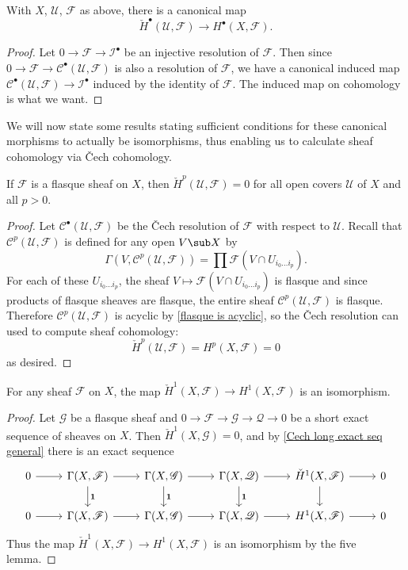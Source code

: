 \begin{corollary}
With $X$, $\mathcal{U}$, $\mathscr{F}$ as above, there is a canonical map
\[\check{H}^\bullet(\mathcal{U},\mathscr{F})\to H^\bullet(X,\mathscr{F}).\]
\end{corollary}
\begin{proof}
Let $0\to\mathscr{F}\to\mathscr{I}^\bullet$ be an injective resolution of $\mathscr{F}$. Then since $0\to\mathscr{F}\to\mathscr{C}^\bullet(\mathcal{U},\mathscr{F})$ is also a resolution of $\mathscr{F}$, we have a canonical induced map $\mathscr{C}^\bullet(\mathcal{U},\mathscr{F})\to\mathscr{I}^\bullet$ induced by the identity of $\mathscr{F}$. The induced map on cohomology is what we want.
\end{proof}
We will now state some results stating sufficient conditions for these
canonical morphisms to actually be isomorphisms, thus enabling us to calculate sheaf cohomology via \v{C}ech cohomology.
\begin{proposition}\label{Cech flasque}
If $\mathscr{F}$ is a flasque sheaf on $X$, then $\check{H}^p(\mathcal{U},\mathscr{F})=0$ for all open covers $\mathcal{U}$ of $X$ and all $p>0$.
\end{proposition}
\begin{proof}
Let $\mathscr{C}^\bullet(\mathcal{U},\mathscr{F})$ be the \v{C}ech resolution of $\mathscr{F}$ with respect to $\mathcal{U}$. Recall that $\mathscr{C}^p(\mathcal{U},\mathscr{F})$ is defined for any open $V\sub X$ by
\[\Gamma(V,\mathscr{C}^p(\mathcal{U},\mathscr{F}))=\prod\mathscr{F}(V\cap U_{i_0\dots i_p}).\]
For each of these $U_{i_0\dots i_p}$, the sheaf $V\mapsto\mathscr{F}(V\cap U_{i_0\dots i_p})$ is flasque and since products of flasque sheaves are flasque, the entire sheaf $\mathscr{C}^p(\mathcal{U},\mathscr{F})$ is flasque. Therefore $\mathscr{C}^p(\mathcal{U},\mathscr{F})$ is acyclic by \cref{flasque is acyclic}, so the \v{C}ech resolution can used to compute sheaf cohomology:
\[\check{H}^p(\mathcal{U},\mathscr{F})=H^p(X,\mathscr{F})=0\]
as desired.
\end{proof}
\begin{corollary}\label{Cech H^1}
For any sheaf $\mathscr{F}$ on $X$, the map $\check{H}^1(X,\mathscr{F})\to H^1(X,\mathscr{F})$ is an isomorphism.
\end{corollary}
\begin{proof}
Let $\mathscr{G}$ be a flasque sheaf and $0\to\mathscr{F}\to\mathscr{G}\to\mathscr{Q}\to 0$ be a short exact sequence of sheaves on $X$. Then $\check{H}^1(X,\mathscr{G})=0$, and by \cref{Cech long exact seq general} there is an exact sequence
\[\begin{tikzcd}
0\ar[r]&\Gamma(X,\mathscr{F})\ar[r]\ar[d,"\mathbf{1}"]&\Gamma(X,\mathscr{G})\ar[r]\ar[d,"\mathbf{1}"]&\Gamma(X,\mathscr{Q})\ar[r]\ar[d,"\mathbf{1}"]&\check{H}^1(X,\mathscr{F})\ar[r]\ar[d]&0\\
0\ar[r]&\Gamma(X,\mathscr{F})\ar[r]&\Gamma(X,\mathscr{G})\ar[r]&\Gamma(X,\mathscr{Q})\ar[r]&H^1(X,\mathscr{F})\ar[r]&0
\end{tikzcd}\]
Thus the map $\check{H}^1(X,\mathscr{F})\to H^1(X,\mathscr{F})$ is an isomorphism by the five lemma.
\end{proof}
